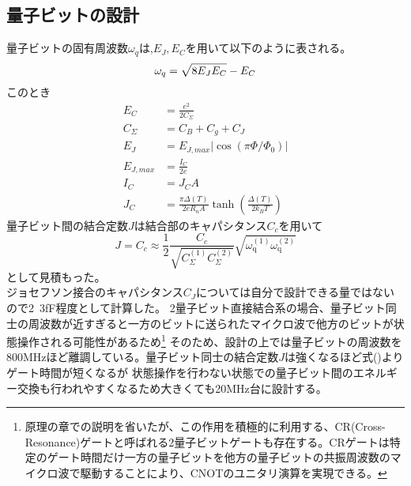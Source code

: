 \subsection{量子ビットの設計}
量子ビットの固有周波数$\omega_q$は,$E_J,E_C$を用いて以下のように表される。
\begin{equation}
    \omega_q = \sqrt{8E_JE_C}-E_C \\
\end{equation}
このとき
\begin{equation}
    \begin{aligned}
        E_C &= \frac{e^2}{2C_{\Sigma}}\\
        C_{\Sigma} & = C_B+C_g+C_J\\
        E_J &= E_{J,max}|\cos(\pi \Phi/\Phi_0)| \\
        E_{J,max} &= \frac{I_C}{2e} \\
        I_C &= J_{C}A\\
        J_{C}&=\frac{\pi \Delta(T)}{2 e R_{n} A} \tanh \left(\frac{\Delta(T)}{2 k_{B} T}\right)
    \end{aligned}
\end{equation}
量子ビット間の結合定数$J$は結合部のキャパシタンス$C_c$を用いて
\begin{equation}
    J=C_{c} \approx \frac{1}{2} \frac{C_{c}}{\sqrt{C_{\Sigma}^{(1)} C_{\Sigma}^{(2)}}} \sqrt{\omega_{\mathrm{q}}^{(1)} \omega_{\mathrm{q}}^{(2)}}
\end{equation}
として見積もった。\\
ジョセフソン接合のキャパシタンス$C_J$については自分で設計できる量ではないので2~3fF程度として計算した。
2量子ビット直接結合系の場合、量子ビット同士の周波数が近すぎると一方のビットに送られたマイクロ波で他方のビットが状態操作される可能性があるため\footnote{原理の章での説明を省いたが、この作用を積極的に利用する、CR(Cross-Resonance)ゲートと呼ばれる2量子ビットゲートも存在する。CRゲートは特定のゲート時間だけ一方の量子ビットを他方の量子ビットの共振周波数のマイクロ波で駆動することにより、CNOTのユニタリ演算を実現できる。}
そのため、設計の上では量子ビットの周波数を800MHzほど離調している。量子ビット同士の結合定数$J$は強くなるほど式()よりゲート時間が短くなるが
状態操作を行わない状態での量子ビット間のエネルギー交換も行われやすくなるため大きくても20MHz台に設計する。\\
